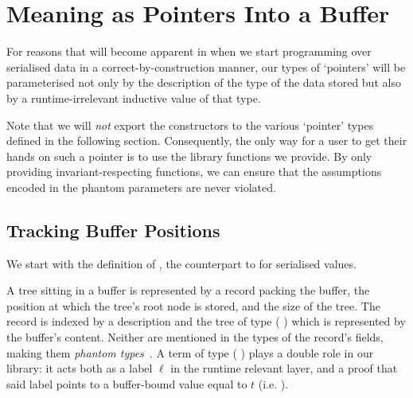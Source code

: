 \section{Meaning as Pointers Into a Buffer}\label{sec:pointers}

For reasons that will become apparent in 
when we start programming over serialised data in a correct-by-construction
manner, our types of `pointers' will be parameterised not only
by the description of the type of the data stored but also by a
runtime-irrelevant inductive value of that type.

Note that we will \emph{not} export the constructors to the various
`pointer' types defined in the following section.
%
Consequently, the only way for a user to get their hands on such a
pointer is to use the library functions we provide.
%
By only providing invariant-respecting functions, we can ensure
that the assumptions encoded in the phantom parameters are never
violated.

\subsection{Tracking Buffer Positions}

We start with the definition of ,
the counterpart to  for serialised values.


A tree sitting in a buffer is represented
by a record packing the buffer, the position at which the tree's
root node is stored, and the size of the tree.
%
The record is indexed by  a  description
and  the tree of type ( )
which is represented by the buffer's content.
Neither are mentioned in the types of the record's fields, making them
\emph{phantom types}~\citep{DBLP:conf/dsl/LeijenM99}.
%
A term of type (  )
plays a double role in our library: it acts both as a label $\ell$ in
the runtime relevant layer, and a proof that said label points to a
buffer-bound value equal to $t$
(i.e. ).



